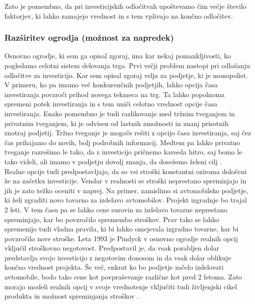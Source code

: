 \documentclass[12pt, a4paper]{amsart}
\theoremstyle{definition} %
\theoremstyle{plain} %
\begin{document}
Zato je pomembno, da pri investicijskih odločitvah upoštevamo čim večje število faktorjev, ki lahko zamajejo vrednost in s tem vplivajo na končno odločitev.   
 
\subsubsection{Razširitev ogrodja (možnost za napredek)}
Osnovno ogrodje, ki sem ga opisal zgoraj, ima kar nekaj pomankljivosti, ko pogledamo celotni sistem delovanja trga. Prvi večji problem nastopi pri odlašanju odločitve za investicijo. Kar sem opisal zgoraj velja za podjetje, ki je monopolist. V primeru, ko pa imamo več konkurenčnih podjetjih, lahko opcija časa investiranja povzroči prihod novega tekmeca na trg. Ta lahko popolnoma spremeni potek investiranja in s tem uniči celotno vrednost opcije časa investiranja. Enako pomembno je tudi razlikovanje med tržnim tveganjem in privatnim tveganjem, ki je odvisen od lastnih zmožnosti in znanj prisotnih znotraj podjetij. Tržno tveganje je mogoče rešiti z opcijo časa investiranja, saj čez čas prihajamo do novih, bolj podrobnih informacij. Medtem pa lahko privatno tveganje razrešimo le tako, da z investicijo pričnemo karseda hitro, saj bomo le tako videli, ali imamo v podjetju dovolj znanja, da dosežemo želeni cilj \cite[str. 38, 39]{Brach}. \\

Realne opcije tudi predpostavljajo, da so vsi stroški konstantni oziroma določeni že na začetku investicije. Vendar v realnosti se stroški neprestano spreminjajo in jih je zato težko oceniti v naprej. Na primer, zamislimo si avtomobilsko podjetje, ki želi zgraditi novo tovarno za izdelavo avtomobilov. Projekt izgradnje bo trajal 2 leti. V tem času pa se lahko cene surovin za izdelavo tovarne neprestano spreminjajo, kar bo povzročilo spremembo stroškov. Prav tako se lahko spremenijo tudi vladna pravila, ki bi lahko omejevala izgradno tovarne, kar bi povzročilo nove stroške. Leta 1993 je Pindyck v osnovno ogrodje realnih opcij vključil stroškovno negotovost. Predpostavil je, da vsak porabljen dolar predstavlja svojo investicijo z negotovim donosom in da vsak dolar oblikuje končno vrednost projekta. Še več, enkrat ko bo podjetje začelo izdelovati avtomobile, bodo tako cene kot povpraševanje različne kot pred 2 letoma. Zato morajo modeli realnih opcij v svoje vrednotenje vključiti tudi življenjski cikel produkta in možnost spreminjanja stroškov \cite[str. 39-42]{Brach}. \\
\end{document}

